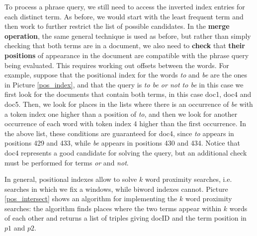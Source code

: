 To process a phrase query, we still need to access the inverted index entries for each distinct term. As before, we would start with the least frequent term and then work to further restrict the list of possible candidates. In the \textbf{merge operation}, the same general technique is used as before, but rather than simply checking that both terms are in a document, we also need to \textbf{check} that \textbf{their positions} of appearance in the document are compatible with the phrase query being evaluated. This requires working out offsets between the words. For example, suppose that the positional index for the words \textit{to} and \textit{be} are the ones in Picture \ref{pos_index}, and that the query is \textit{to be or not to be}  in this case we first look for the documents that contain both terms, in this case doc1, doc4 and doc5. Then, we look for places in the lists where there is an occurrence of \textit{be} with a token index one higher than a position of \textit{to}, and then we look for another occurrence of each word with token index 4 higher than
the first occurrence. In the above list, these conditions are guaranteed for doc4, since \textit{to} appears in positions 429 and 433, while \textit{be} appears in positions 430 and 434. Notice that doc4 represents a good candidate for solving the query, but an additional check must be performed for terms \textit{or} and \textit{not}.

In general, positional indexes allow to solve $k$ word proximity searches, i.e. searches in which we fix a windows, while biword indexes cannot. Picture \ref{pos_intersect} shows an algorithm for implementing the $k$ word proximity searches: the algorithm finds places where the two terms appear within $k$ words of each other and returns a list of triples giving docID and the term position in $p1$ and $p2$.

